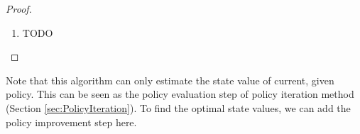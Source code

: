 \begin{proof}
\begin{enumerate}
\begin{align}
                                  &= \E[r_{t+1} + \gamma v_t(s_{t+1})|S_t=s_t] - v_\pi(s_t)
                                  &= \gamma \E[v_t(s_{t+1}) - v_\pi(s_{t+1})|S_t=s_t] \\
                                  &= \gamma \sum_{s' \in \mathcal{S}}p(s'|s_t)[v_t(s')-v_\pi(s')]
                \end{align}
                Applying $|\cdot|$ to both sides of equation, we get
                \begin{align}
                    |\E[\eta_t(s_t)]| &= \gamma \Big| \sum_{s' \in \mathcal{S}}p(s'|s_t)[v_t(s')-v_\pi(s')] \Big| \\
                                      &\leq \gamma \sum_{s' \in \mathcal{S}}p(s'|s_t)\max_{s'\in\mathcal{S}}{|v_t(s')-v_\pi(s')|} \\
                                      &= \gamma \max_{s' \in \mathcal{S}}{|v_t(s') - v_\pi(s')|} \\
                                      &= \gamma \|v_t(s')-v_\pi(s')\|_\infty \\
                                      &= \gamma \|\Delta_t(s)\|_\infty
                \end{align}
            \item TODO
        \end{enumerate}
    \end{proof}
    Note that this algorithm can only estimate the state value of current, given policy. This can be seen as the policy evaluation step of policy iteration method (Section \ref{sec:PolicyIteration}).
    To find the optimal state values, we can add the policy improvement step here.



